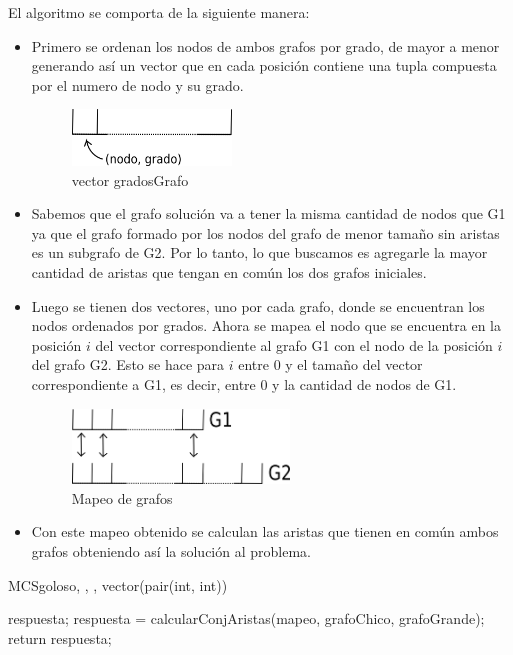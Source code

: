 El algoritmo se comporta de la siguiente manera:
\begin{itemize}
\item Primero se ordenan los nodos de ambos grafos por grado, de mayor a menor generando así un vector que en cada posición contiene una tupla compuesta por el numero de nodo y su grado. \\
\begin{figure}[H]
\centering
      \includegraphics[height=1.5cm]{graficos/ejercicio4-1.png}
      \caption{vector gradosGrafo}
\end{figure}
\item Sabemos que el grafo solución va a tener la misma cantidad de nodos que G1 ya que el grafo formado por los nodos del grafo de menor tamaño sin aristas es un subgrafo de G2. Por lo tanto, lo que buscamos es agregarle la mayor cantidad de aristas que tengan en común los dos grafos iniciales.
\item Luego se tienen dos vectores, uno por cada grafo, donde se encuentran los nodos ordenados por grados. Ahora se mapea el nodo que se encuentra en la posición $i$ del vector correspondiente al grafo G1 con el nodo de la posición $i$ del grafo G2. Esto se hace para $i$ entre 0 y el tamaño del vector correspondiente a G1, es decir, entre 0 y la cantidad de nodos de G1. \\
\begin{figure}[H]
\centering
      \includegraphics[height=2cm]{graficos/ejercicio4-2.png}
      \caption{Mapeo de grafos}
\end{figure}
\item Con este mapeo obtenido se calculan las aristas que tienen en común ambos grafos obteniendo así la solución al problema. 

\end{itemize}

\begin{algoritmo}{MCSgoloso}{, , , }{vector(pair(int, int))}

	
	 respuesta;
	respuesta = calcularConjAristas(mapeo, grafoChico, grafoGrande);
	return respuesta;      

\end{algoritmo}


